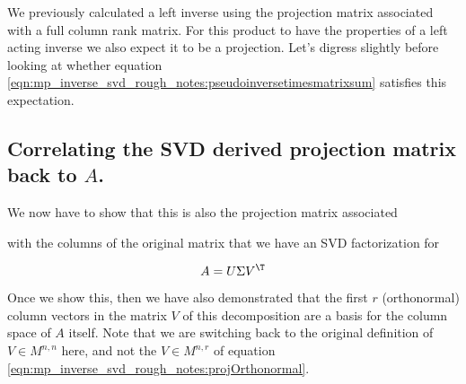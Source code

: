 We previously calculated a left inverse using the projection matrix associated with a full column rank matrix.  For this product to have the properties of a
left acting inverse we also expect it to be a projection.
Let's digress
slightly before looking at whether equation
\ref{eqn:mp_inverse_svd_rough_notes:pseudoinversetimesmatrixsum} satisfies this expectation.



\subsection{Correlating the SVD derived projection matrix back to $A$. }


We now have to show that this is also the projection matrix associated

with the columns of the 
original matrix that we have an SVD factorization for

\[
A = U \Sigma V^\T
\]

Once we show this, then we have also demonstrated that the first $r$ 
(orthonormal) column vectors in the matrix $V$ of this decomposition
are a basis for the column space of $A$ itself.  Note that we are
switching back to the original definition of $V \in M^{n,n}$ here, and
not the $V \in M^{n,r}$ of equation \ref{eqn:mp_inverse_svd_rough_notes:projOrthonormal}.

